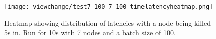 \begin{figure}[h!]
\centering
\texttt{[image: viewchange/test7\_100\_7\_100\_timelatencyheatmap.png]}
\caption{Heatmap showing distribution of latencies with a node being killed 5s in. Run for 10s with 7 nodes and a batch size of 100.}
\end{figure}








